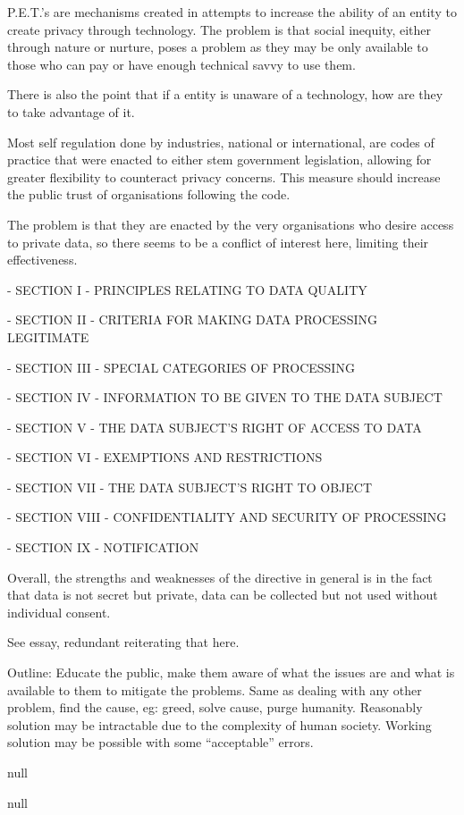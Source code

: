 P.E.T.'s are mechanisms created in attempts to increase the ability of an entity to create privacy through technology. The problem is that social inequity, either through nature or nurture, poses a problem as they may be only available to those who can pay or have enough technical savvy to use them.

There is also the point that if a entity is unaware of a technology, how are they to take advantage of it.


Most self regulation done by industries, national or international, are codes of practice that were enacted to either stem government legislation, allowing for greater flexibility to counteract privacy concerns. This measure should increase the public trust of organisations following the code.

The problem is that they are enacted by the very organisations who desire access to private data, so there seems to be a conflict of interest here, limiting their effectiveness.


\item - SECTION I - PRINCIPLES RELATING TO DATA QUALITY
\item - SECTION II - CRITERIA FOR MAKING DATA PROCESSING LEGITIMATE
\item - SECTION III - SPECIAL CATEGORIES OF PROCESSING
\item - SECTION IV - INFORMATION TO BE GIVEN TO THE DATA SUBJECT
\item - SECTION V - THE DATA SUBJECT'S RIGHT OF ACCESS TO DATA
\item - SECTION VI - EXEMPTIONS AND RESTRICTIONS
\item - SECTION VII - THE DATA SUBJECT'S RIGHT TO OBJECT
\item - SECTION VIII - CONFIDENTIALITY AND SECURITY OF PROCESSING
\item - SECTION IX - NOTIFICATION

Overall, the strengths and weaknesses of the directive in general is in the fact that data is not secret but private, data can be collected but not used without individual consent.


See essay, redundant reiterating that here.

Outline: Educate the public, make them aware of what the issues are and what is available to them to mitigate the problems. Same as dealing with any other problem, find the cause, eg: greed, solve cause, purge humanity. Reasonably solution may be intractable due to the complexity of human society. Working solution may be possible with some ``acceptable'' errors.


null


null

\bye
